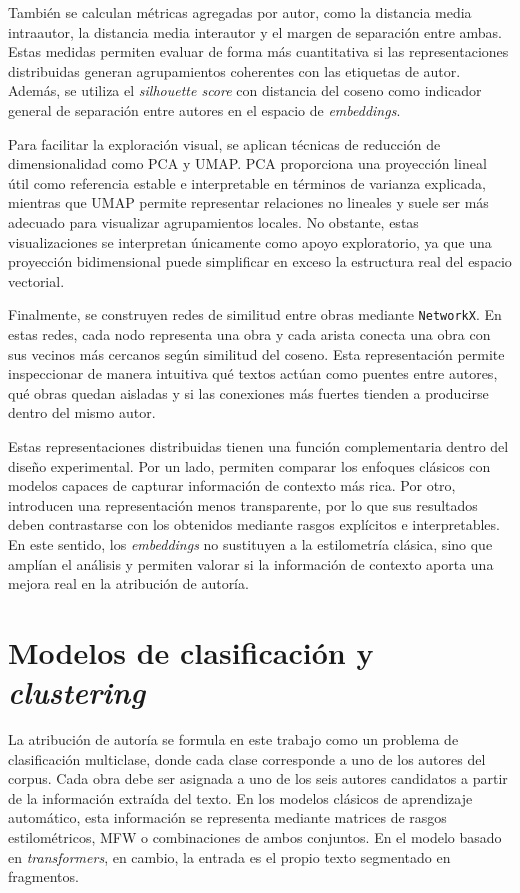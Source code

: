 \documentclass[IB]{TFUOC}%
\begin{document}
También se calculan métricas agregadas por autor, como la distancia media intraautor, la distancia media interautor y el margen de separación entre ambas. Estas medidas permiten evaluar de forma más cuantitativa si las representaciones distribuidas generan agrupamientos coherentes con las etiquetas de autor. Además, se utiliza el \textit{silhouette score} con distancia del coseno como indicador general de separación entre autores en el espacio de \textit{embeddings}.

Para facilitar la exploración visual, se aplican técnicas de reducción de dimensionalidad como PCA y UMAP. PCA proporciona una proyección lineal útil como referencia estable e interpretable en términos de varianza explicada, mientras que UMAP permite representar relaciones no lineales y suele ser más adecuado para visualizar agrupamientos locales. No obstante, estas visualizaciones se interpretan únicamente como apoyo exploratorio, ya que una proyección bidimensional puede simplificar en exceso la estructura real del espacio vectorial.

Finalmente, se construyen redes de similitud entre obras mediante \texttt{NetworkX}\cite{NetworkXWebsite}. En estas redes, cada nodo representa una obra y cada arista conecta una obra con sus vecinos más cercanos según similitud del coseno. Esta representación permite inspeccionar de manera intuitiva qué textos actúan como puentes entre autores, qué obras quedan aisladas y si las conexiones más fuertes tienden a producirse dentro del mismo autor.

Estas representaciones distribuidas tienen una función complementaria dentro del diseño experimental. Por un lado, permiten comparar los enfoques clásicos con modelos capaces de capturar información de contexto más rica. Por otro, introducen una representación menos transparente, por lo que sus resultados deben contrastarse con los obtenidos mediante rasgos explícitos e interpretables. En este sentido, los \textit{embeddings} no sustituyen a la estilometría clásica, sino que amplían el análisis y permiten valorar si la información de contexto aporta una mejora real en la atribución de autoría.

\section{Modelos de clasificación y \textit{clustering}}

La atribución de autoría se formula en este trabajo como un problema de clasificación multiclase, donde cada clase corresponde a uno de los autores del corpus. Cada obra debe ser asignada a uno de los seis autores candidatos a partir de la información extraída del texto. En los modelos clásicos de aprendizaje automático, esta información se representa mediante matrices de rasgos estilométricos, MFW o combinaciones de ambos conjuntos. En el modelo basado en \textit{transformers}, en cambio, la entrada es el propio texto segmentado en fragmentos.
\end{document}
